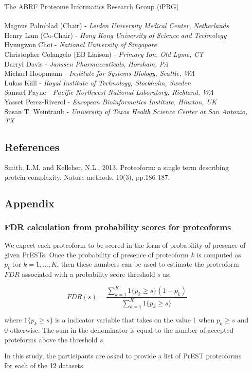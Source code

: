 \documentclass[a4paper,12pt]{article}
\begin{document}
The ABRF Proteome Informatics Research Group (iPRG)\\
\\
Magnus Palmblad (Chair) - \textit{Leiden University Medical Center, Netherlands}\\
Henry Lam (Co-Chair) - \textit{Hong Kong University of Science and Technology}\\
Hyungwon Choi - \textit{National University of Singapore}\\
Christopher Colangelo (EB Liaison) - \textit{Primary Ion, Old Lyme, CT}\\
Darryl Davis - \textit{Janssen Pharmaceuticals, Horsham, PA}\\
Michael Hoopmann - \textit{Institute for Systems Biology, Seattle, WA}\\ 
Lukas K\"{a}ll - \textit{Royal Institute of Technology, Stockholm, Sweden}\\
Samuel Payne - \textit{Pacific Northwest National Laboratory, Richland, WA}\\
Yasset Perez-Riverol - \textit{European Bioinformatics Institute, Hinxton, UK}\\
Susan T. Weintraub - \textit{University of Texas Health Science Center at San Antonio, TX}\\ 
 
\subsection*{References}
 Smith, L.M. and Kelleher, N.L., 2013. Proteoform: a single term describing protein complexity. Nature methods, 10(3), pp.186-187.

\clearpage
\subsection*{Appendix}
\subsubsection*{FDR calculation from probability scores for proteoforms}
We expect each proteoform to be scored in the form of probability of presence of given PrESTs. Once the probability of presence of proteoform \(k\) is computed as \(p_k\) for \(k = 1,\dotsc,K\), then these numbers can be used to estimate the proteoform \(FDR\) associated with a probability score threshold \(s\) as:


\[
FDR(s) = \frac{\displaystyle\sum_{k=1}^{K} 1\{p_k \geq s\}(1-p_k)}{\displaystyle\sum_{k=1}^{K} 1\{p_k \geq s\}}
\]

where \(1\{p_k \geq s\}\) is a indicator variable that takes on the
value 1 when \(p_k \geq s\) and 0 otherwise. The sum in the
denominator is equal to the number of accepted proteforms above the
threshold \(s\). 


In this study, the participants are asked to provide a list of PrEST proteoforms for each of the 12 datasets.
\end{document}

